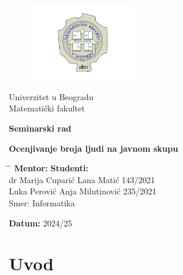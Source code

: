 \documentclass[a4paper,12pt]{article}
\begin{document}
\begin{titlepage}
    \centering
	\begin{figure}[htbp]
    	\centering
    	\includegraphics[width=0.4\textwidth]{./logo.png}
	\end{figure}
    { Univerzitet u Beogradu \\ Matematički fakultet\par}
	
    \vfill

    {\Large \textbf{Seminarski rad}\par}

    \vspace{1cm}

    {\Large \textbf{Ocenjivanje broja ljudi na javnom skupu}\par}

    \vfill

    
	
	
	\begin{tabbing}
	\hspace{10cm} \= \hspace{10cm} \= \kill
	\textbf{Mentor:} \>  \textbf{Studenti:} \\
	dr Marija Cuparić \> Lana Matić 143/2021 \\
	Luka Perović \> Anja Milutinović 235/2021 \\
	\> Smer: Informatika
	\end{tabbing}

    \vfill

    \textbf{Datum:} 2024/25

\end{titlepage}
\newpage
\tableofcontents
\newpage
\section{Uvod}
\end{document}
